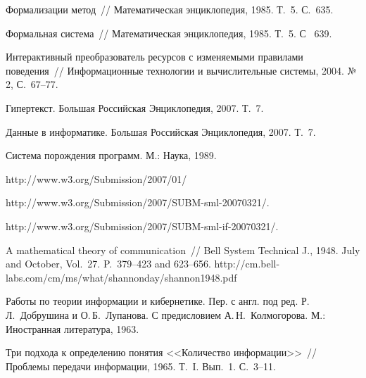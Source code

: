 \begin{multicols}{2}
{{\begin{thebibliography}{99}
Формализации метод~// Математическая
энциклопедия, 1985. Т.~5. С.~635.

Формальная система~// Математическая
энциклопедия, 1985. Т.~5. С~ 639.

 Интерактивный преобразователь ресурсов с 
изменяемыми правилами поведения~// Информационные технологии и вычислительные 
системы, 2004. №\,2, С.~67--77.

Гипертекст. Большая Российская Энциклопедия, 2007.
Т.~7.

Данные в информатике. Большая Российская
Энциклопедия, 2007. Т.~7.

Система порождения программ. М.: Наука, 1989.

{\sf http://www.w3.org/Submission/2007/01/}

{\sf http://www.w3.org/Submission/2007/SUBM-sml-20070321/.}

{\sf http://www.w3.org/Submission/2007/SUBM-sml-if-20070321/}.

A mathematical theory of communication~// Bell System
Technical J., 1948. July and October, Vol.~27. P.~379--423 and 623--656.
{\sf http://cm.bell-labs.com/cm/ms/what/shannonday/shannon1948.pdf}

Работы по теории информации и кибернетике. Пер. с англ.
под ред. Р.\,Л.~Добрушина и О.\,Б.~Лупанова. С предисловием А.\,Н.~Колмогорова.
М.: Иностранная литература, 1963.

Три подхода к определению понятия <<Количество
информации>>~// Проблемы передачи информации, 1965.
Т.~I. Вып.~1. С.~3--11.
\end{thebibliography}

} } \label{end\stat}
\end{multicols}